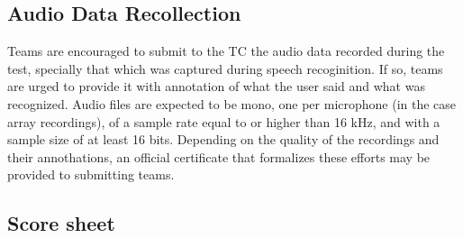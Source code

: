 \subsection {Audio Data Recollection}
Teams are encouraged to submit to the TC the audio data recorded during the test, specially that which was captured during speech recoginition. If so, teams are urged to provide it with annotation of what the user said and what was recognized. Audio files are expected to be mono, one per microphone (in the case array recordings), of a sample rate equal to or higher than 16 kHz, and with a sample size of at least 16 bits. Depending on the quality of the recordings and their annothations, an official certificate that formalizes these efforts may be provided to submitting teams.

\newpage
\subsection{Score sheet}


